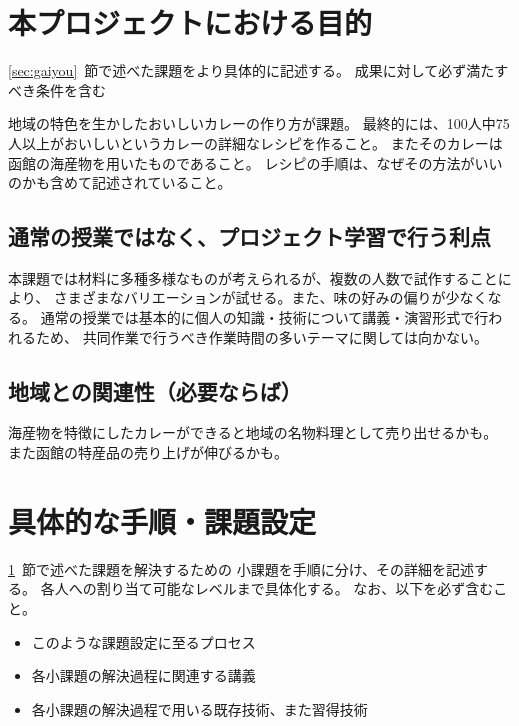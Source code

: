 \documentclass[openany,11pt,papersize]{jsbook}
\begin{document}
\section{本プロジェクトにおける目的}\label{sec:mokuteki}
\begin{hissu}
\ref{sec:gaiyou}~節で述べた課題をより具体的に記述する。
成果に対して必ず満たすべき条件を含む
\end{hissu}

地域の特色を生かしたおいしいカレーの作り方が課題。
最終的には、100人中75人以上がおいしいというカレーの詳細なレシピを作ること。
またそのカレーは函館の海産物を用いたものであること。
レシピの手順は、なぜその方法がいいのかも含めて記述されていること。

\subsection{通常の授業ではなく、プロジェクト学習で行う利点}

本課題では材料に多種多様なものが考えられるが、複数の人数で試作することにより、 
さまざまなバリエーションが試せる。また、味の好みの偏りが少なくなる。 
通常の授業では基本的に個人の知識・技術について講義・演習形式で行われるため、 
共同作業で行うべき作業時間の多いテーマに関しては向かない。


\subsection{地域との関連性（必要ならば）}

海産物を特徴にしたカレーができると地域の名物料理として売り出せるかも。 
また函館の特産品の売り上げが伸びるかも。



\section{具体的な手順・課題設定}\label{sec:tejun}
\begin{hissu}
\ref{sec:mokuteki}~節で述べた課題を解決するための
小課題を手順に分け、その詳細を記述する。 
各人への割り当て可能なレベルまで具体化する。
なお、以下を必ず含むこと。 
\begin{itemize}
 \item このような課題設定に至るプロセス　 
 \item 各小課題の解決過程に関連する講義 
 \item 各小課題の解決過程で用いる既存技術、また習得技術
\end{itemize}
\end{hissu}
\end{document}
